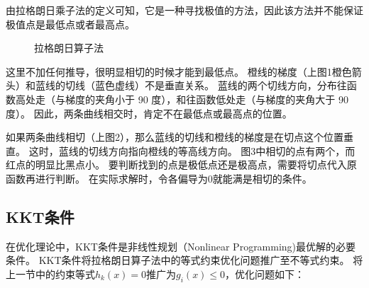 由拉格朗日乘子法的定义可知，它是一种寻找极值的方法，因此该方法并不能保证极值点是最低点或者最高点。
\begin{figure}[!htb] \centering 
	\caption{拉格朗日算子法}
\end{figure}

这里不加任何推导，很明显相切的时候才能到最低点。
橙线的梯度（上图1橙色箭头）和蓝线的切线（蓝色虚线）不是垂直关系。
蓝线的两个切线方向，分布往函数高处走（与梯度的夹角小于 90 度），和往函数低处走（与梯度的夹角大于 90 度）。
因此，两条曲线相交时，肯定不在最低点或最高点的位置。

如果两条曲线相切（上图2），那么蓝线的切线和橙线的梯度是在切点这个位置垂直。
这时，蓝线的切线方向指向橙线的等高线方向。
图3中相切的点有两个，而红点的明显比黑点小。
要判断找到的点是极低点还是极高点，需要将切点代入原函数再进行判断。
在实际求解时，令各偏导为0就能满是相切的条件。

\subsection{KKT条件}
在优化理论中，KKT条件是非线性规划（Nonlinear Programming)最优解的必要条件。
KKT条件将拉格朗日算子法中的等式约束优化问题推广至不等式约束。
将上一节中的约束等式$h_k(x)=0$推广为$g_i(x) \le 0$，优化问题如下：

